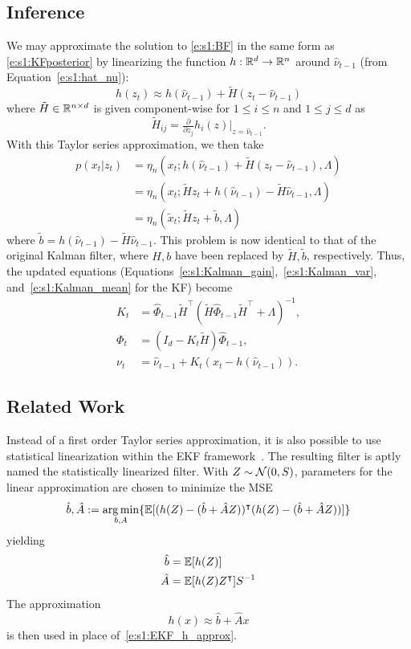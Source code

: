 \subsection{Inference}
We may approximate the solution to \eqref{e:s1:BF} in the same form as \eqref{e:s1:KFposterior}
by linearizing the function $h:\mathbb{R}^d\to\mathbb{R}^n$ around $\hat \nu_{t-1}$ (from Equation~\ref{e:s1:hat_nu}):
\begin{equation} \label{e:s1:EKF_h_approx}
h(z_t) \approx h(\hat \nu_{t-1}) + \tilde H (z_t - \hat \nu_{t-1})
\end{equation}
where $\tilde H \in\mathbb{R}^{n\times d}$ is given component-wise for $1\leq i \leq n$ and $1 \leq j \leq d$ as
\begin{equation}
\tilde H_{ij} = \tfrac{\partial}{\partial z_j} h_i(z) \big\vert_{z=\hat \nu_{t-1}}.
\end{equation}
With this Taylor series approximation, we then take
\begin{align}
p(x_t|z_t) 
&= \eta_n(x_t; h(\hat \nu_{t-1}) + \tilde H (z_t - \hat \nu_{t-1}), \Lambda) \\
&= \eta_n(x_t ; \tilde H z_t + h(\hat \nu_{t-1}) -\tilde H \hat \nu_{t-1}, \Lambda) \\
&= \eta_n(\tilde x_t; \tilde H z_t + \tilde b, \Lambda)
\end{align}
where $\tilde b =  h(\hat \nu_{t-1}) -\tilde H \hat \nu_{t-1}$.  This problem is now identical to that of the original Kalman filter, where $H,b$ have been replaced by $\tilde H, \tilde b$, respectively.  Thus, the updated equations (Equations~\ref{e:s1:Kalman_gain},~\ref{e:s1:Kalman_var}, and~\ref{e:s1:Kalman_mean} for the KF) become
\begin{align}
K_t &= \hat\Phi_{t-1}\tilde H^\intercal(\tilde H\hat\Phi_{t-1}\tilde H^\intercal + \Lambda)^{-1} \label{e:s1:ekf_gain}, \\
\Phi_t &= (I_d - K_t\tilde H)\hat\Phi_{t-1} \label{e:s1:ekf_phi}, \\
\nu_t &= \hat\nu_{t-1} + K_t(x_t - h(\hat\nu_{t-1}) ) \label{e:s1:ekf_nu}.
\end{align}

\subsection{Related Work}
Instead of a first order Taylor series approximation, it is also possible to use statistical linearization within the EKF framework~\cite{Gel74,Sar13}.  The resulting filter is aptly named the statistically linearized filter.  With $Z\sim\mathcal{N}(0,S)$, parameters for the linear approximation are chosen to minimize the MSE
\begin{equation}
\hat b, \hat A := \operatorname*{\arg\min}_{b,A}\{\operatorname{\mathbb{E}}[(h(Z)-(\hat b + \hat A Z))^\intercal (h(Z)-(\hat b + \hat A Z))]\}
\end{equation}
yielding
\begin{align}
\hat b & = \operatorname{\mathbb{E}}[h(Z)]\\
\hat A & = \operatorname{\mathbb{E}}[h(Z) Z^\intercal] S^{-1}
\end{align}
The approximation 
\begin{equation}
h(x)\approx \hat b + \hat A x
\end{equation}
is then used in place of~\eqref{e:s1:EKF_h_approx}.



